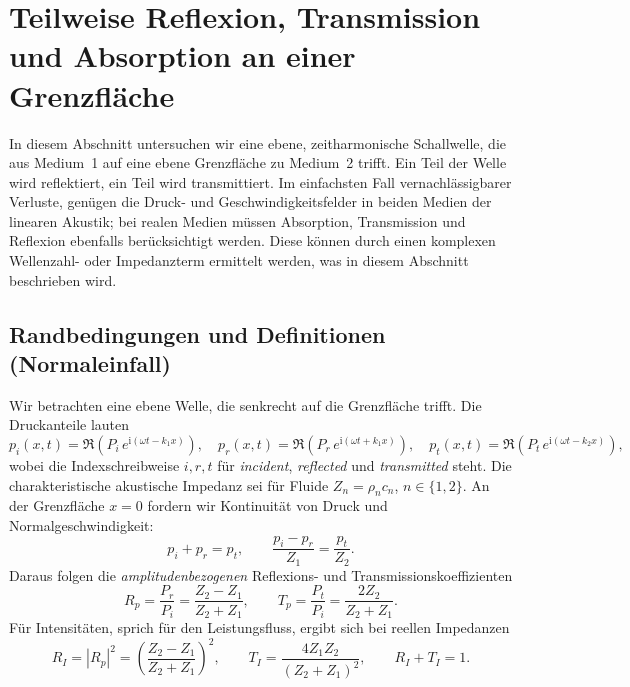 %
%
%
%
\section{Teilweise Reflexion, Transmission und Absorption an einer Grenzfläche
\label{schall:section:teil2}}

In diesem Abschnitt untersuchen wir eine ebene, zeit\-harmonische Schallwelle,
die aus Medium~1 auf eine ebene Grenzfläche zu Medium~2 trifft.
Ein Teil der Welle wird reflektiert, ein Teil wird transmittiert.
Im einfachsten Fall vernachlässigbarer Verluste, genügen die Druck- und
Geschwindigkeitsfelder in beiden Medien der linearen Akustik;
bei realen Medien müssen Absorption, Transmission und Reflexion ebenfalls
berücksichtigt werden.
Diese können durch einen komplexen Wellenzahl- oder Impedanzterm
ermittelt werden, was in diesem Abschnitt beschrieben wird.

\subsection{Randbedingungen und Definitionen (Normal\-einfall)}
Wir betrachten eine ebene Welle, die senkrecht auf die Grenzfläche trifft.
Die Druckanteile lauten
\[
    p_i(x,t)=\Re( P_i\,e^{\mathrm{i}(\omega t-k_1 x)}),\quad
    p_r(x,t)=\Re( P_r\,e^{\mathrm{i}(\omega t+k_1 x)}),\quad
    p_t(x,t)=\Re( P_t\,e^{\mathrm{i}(\omega t-k_2 x)}),
\]
wobei die Indexschreibweise $i,r,t$ für \emph{incident}, \emph{reflected} und \emph{transmitted} steht.
Die charakteristische akustische Impedanz sei für Fluide $Z_n=\rho_n c_n$, $n\in\{1,2\}$.
An der Grenzfläche $x=0$ fordern wir Kontinuität von Druck und Normalgeschwindigkeit:
\[
    p_i+p_r=p_t,\qquad \frac{p_i-p_r}{Z_1}=\frac{p_t}{Z_2}.
\]
Daraus folgen die \emph{amplitudenbezogenen} Reflexions- und Transmissionskoeffizienten
\begin{equation}
    R_p=\frac{P_r}{P_i}=\frac{Z_2-Z_1}{Z_2+Z_1},
    \qquad
    T_p=\frac{P_t}{P_i}=\frac{2Z_2}{Z_2+Z_1}.
    \label{eq:RpTp}
\end{equation}
Für Intensitäten, sprich für den Leistungsfluss, ergibt sich bei reellen Impedanzen \cite{schall:kinsler, schall:allenRT}
\begin{equation}
    R_I=\left|R_p\right|^2=\left(\frac{Z_2-Z_1}{Z_2+Z_1}\right)^2,\qquad
    T_I=\frac{4Z_1Z_2}{(Z_2+Z_1)^2},
    \qquad
    R_I+T_I=1.
    \label{eq:RI_TI}
\end{equation}

